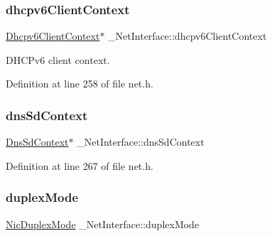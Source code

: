 \mbox{\label{struct__NetInterface_ad2b9fb8d43ac0f3c6bf1b74d56959ef7}} 
\subsubsection{\texorpdfstring{dhcpv6\+Client\+Context}{dhcpv6ClientContext}}
{\footnotesize\ttfamily \hyperlink{dhcpv6__client_8h_aac4eb11915c8cf98cce890c9d0270c9b}{Dhcpv6\+Client\+Context}$\ast$ \+\_\+\+Net\+Interface\+::dhcpv6\+Client\+Context}



D\+H\+C\+Pv6 client context. 



Definition at line 258 of file net.\+h.

\mbox{\label{struct__NetInterface_a5b3f01c67fd54aecd7bc14764dd5fb71}} 
\subsubsection{\texorpdfstring{dns\+Sd\+Context}{dnsSdContext}}
{\footnotesize\ttfamily \hyperlink{dns__sd_8h_a616b4c4abbffa3a360ee2f40bea72cf7}{Dns\+Sd\+Context}$\ast$ \+\_\+\+Net\+Interface\+::dns\+Sd\+Context}



Definition at line 267 of file net.\+h.

\mbox{\label{struct__NetInterface_a92ed8095a7d5e263336aead948cee428}} 
\subsubsection{\texorpdfstring{duplex\+Mode}{duplexMode}}
{\footnotesize\ttfamily \hyperlink{nic_8h_ae96e77ca948a3796e2d1900a73f133da}{Nic\+Duplex\+Mode} \+\_\+\+Net\+Interface\+::duplex\+Mode}



